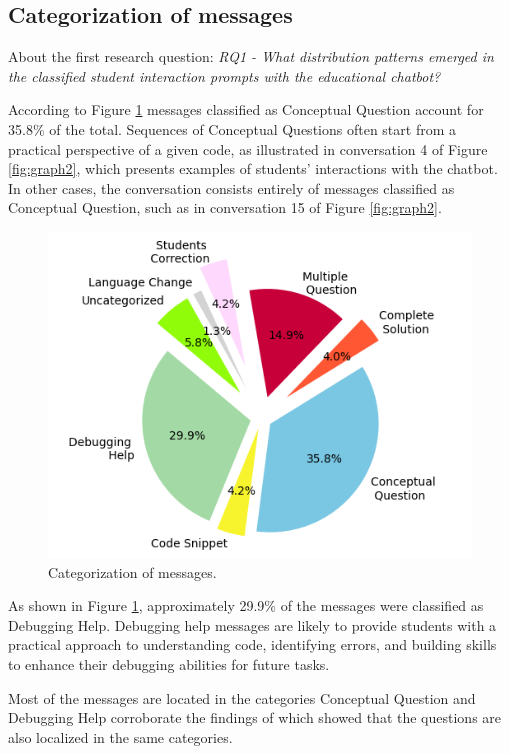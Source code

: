 \documentclass[runningheads]{llncs}
\begin{document}
\subsection{Categorization of messages}

About the first research question: \textit{RQ1 - What distribution patterns
emerged in the classified student interaction prompts with the educational
chatbot?}

According to Figure \ref{fig:graph1} messages classified as
Conceptual Question account for 35.8\% of the total. Sequences of Conceptual
Questions often start from a practical perspective of a given code, as
illustrated in conversation 4 of Figure \ref{fig:graph2}, which presents
examples of students' interactions with the chatbot. In other cases, the
conversation consists entirely of messages classified as Conceptual Question,
such as in conversation 15 of Figure \ref{fig:graph2}.

\begin{figure}[h!]
  \centering
  \includegraphics[scale=0.8]{img/figure1.png}
  \caption{Categorization of messages.}
  \label{fig:graph1}
\end{figure}

As shown in Figure \ref{fig:graph1}, approximately 29.9\% of the messages were
classified as Debugging Help. Debugging help messages are likely to provide
students with a practical approach to understanding code, identifying errors,
and building skills to enhance their debugging abilities for future tasks.

Most of the messages are located in the categories Conceptual Question and
Debugging Help corroborate the findings of \cite{Ghimire24} which showed that
the questions are also localized in the same categories.
\end{document}
